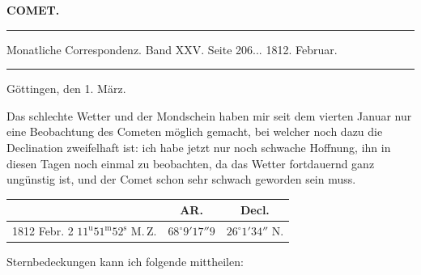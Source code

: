 \clearpage{}\hypertarget{native-352-lower}{}\label{native-352-lower}
\begin{center}\textbf{COMET.}\par\vspace{4pt}\hrule\vspace{4pt}\fontsize{10}{12}\selectfont Monatliche Correspondenz. Band XXV. Seite 206\;... 1812. Februar.\par\vspace{4pt}\hrule\vspace{4pt}\end{center}

\begin{flushright}Göttingen, den 1. März.\end{flushright}
\par\indent Das schlechte Wetter und der Mondschein haben mir seit dem vierten Januar nur eine Beobachtung des Cometen möglich gemacht, bei welcher noch dazu die Declination zweifelhaft ist: ich habe jetzt nur noch schwache Hoffnung, ihn in diesen Tagen noch einmal zu beobachten, da das Wetter fortdauernd ganz ungünstig ist, und der Comet schon sehr schwach geworden sein muss.

\begin{center}
\fontsize{10}{12}\selectfont\setlength{\tabcolsep}{4pt}\begin{tabular}{l|c|c}
 & AR. & Decl. \\
\hline
1812 Febr. 2 \quad $11^{\mathrm{u}}51^{\mathrm{m}}52^{\mathrm{s}}$ M.\,Z. & $68^\circ9'17''9$ & $26^\circ1'34''$ N. \\
\end{tabular}
\end{center}

\par\indent Sternbedeckungen kann ich folgende mittheilen:

